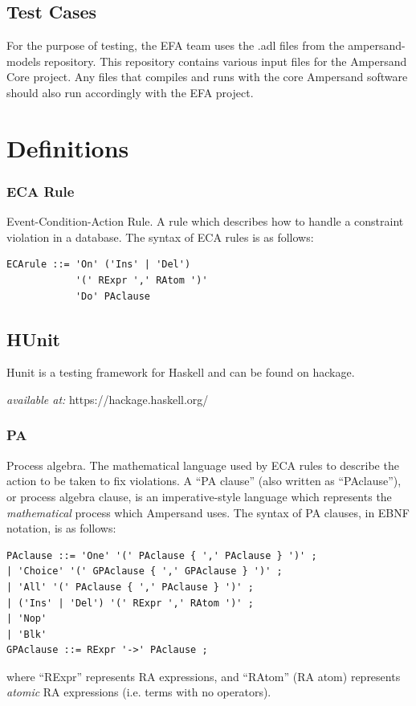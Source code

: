 \documentclass[12pt, svgnames]{article}
\begin{document}
\subsection{Test Cases}
For the purpose of testing, the EFA team uses the .adl files from the ampersand-models repository. This repository contains various input files for the Ampersand Core project. Any files that compiles and runs with the core Ampersand software should also run accordingly with the EFA project.

\section{Definitions}\label{sec:Abbrev}

\subsubsection*{ECA Rule}
 Event-Condition-Action Rule. A rule which describes how to handle a constraint
 violation in a database. The syntax of ECA rules is as follows:
 

\begin{lstlisting}[basicstyle=\ttfamily]
ECArule ::= 'On' ('Ins' | 'Del') 
            '(' RExpr ',' RAtom ')'
            'Do' PAclause    
\end{lstlisting}

\subsection*{HUnit}
Hunit is a testing framework for Haskell and can be found on 
hackage\cite{rwhaskell}.

\textit{available at:} https://hackage.haskell.org/

\subsubsection*{PA}
Process algebra. The mathematical language used by ECA rules to describe the
action to be taken to fix violations. A ``PA clause'' (also written as
``PAclause''), or process algebra clause, is an imperative-style language which
represents the \emph{mathematical} process which Ampersand uses. The syntax of
PA clauses, in EBNF notation, is as follows:

\begin{lstlisting}[basicstyle=\ttfamily]
PAclause ::= 'One' '(' PAclause { ',' PAclause } ')' ; 
| 'Choice' '(' GPAclause { ',' GPAclause } ')' ;  
| 'All' '(' PAclause { ',' PAclause } ')' ;  
| ('Ins' | 'Del') '(' RExpr ',' RAtom ')' ; 
| 'Nop'  
| 'Blk' 
GPAclause ::= RExpr '->' PAclause ; 
\end{lstlisting}
where ``RExpr'' represents RA expressions, and ``RAtom'' (RA atom) represents
\emph{atomic} RA expressions (i.e. terms with no operators).
\end{document}
